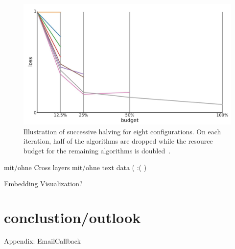 \documentclass[10pt,final,journal,a4paper,oneside,twocolumn]{IEEEtran}
\begin{document}
\begin{figure}[ht]
    \centering
    \includegraphics[width=\linewidth]{successive_halving}
    \caption{Illustration of successive halving for eight configurations. On each iteration, half of the algorithms are dropped while the resource budget for the remaining algorithms is doubled~\cite{Feurer.2019}.}
    \label{fig:succ_halving}
\end{figure}

mit/ohne Cross layers
mit/ohne text data ( :( )

Embedding Visualization?

\section{conclustion/outlook}
Appendix: EmailCallback
\end{document}
